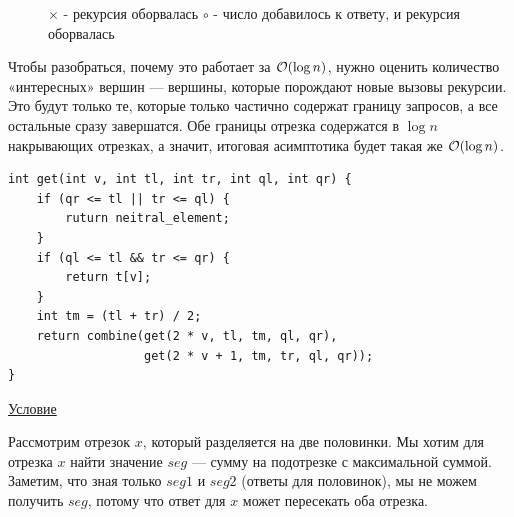 \begin{center}
	\begin{figure}[h]
		\captionsetup{font=small, labelformat=empty}
		\caption{$\times$ - рекурсия оборвалась $\circ$ - число добавилось к ответу, и рекурсия оборвалась}
		\label{fig:image}
	\end{figure}
\end{center}

Чтобы разобраться, почему это работает за $\mathcal{O}(\log n)$, нужно оценить количество «интересных» вершин --- вершины, которые порождают новые вызовы рекурсии. Это будут только те, которые только частично содержат границу запросов, а все остальные сразу завершатся. Обе границы отрезка содержатся в $\log n$ накрывающих отрезках, а значит, итоговая асимптотика будет такая же $\mathcal{O}(\log n)$.

\begin{verbatim}
int get(int v, int tl, int tr, int ql, int qr) {
	if (qr <= tl || tr <= ql) {
		ruturn neitral_element;
	}
	if (ql <= tl && tr <= qr) {
		return t[v];
	}
	int tm = (tl + tr) / 2;
	return combine(get(2 * v, tl, tm, ql, qr),
	               get(2 * v + 1, tm, tr, ql, qr));
}
\end{verbatim}

\pagebreak

 \href{https://codeforces.com/edu/course/2/lesson/4/2/practice/contest/273278/problem/A}{Условие}

Рассмотрим отрезок $x$, который разделяется на две половинки. Мы хотим для отрезка $x$ найти значение $seg$ — сумму на подотрезке с максимальной суммой. Заметим, что зная только $seg1$ и $seg2$ (ответы для половинок), мы не можем получить $seg$, потому что ответ для $x$ может пересекать оба отрезка.
\down

